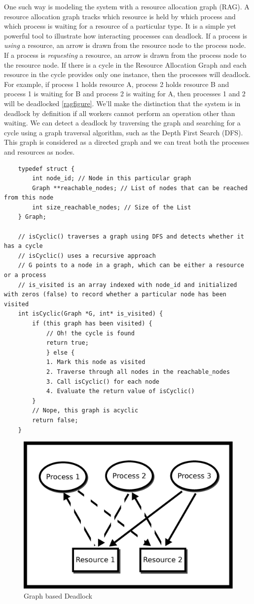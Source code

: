 One such way is modeling the system with a resource allocation graph (\gls{RAG}).
A resource allocation graph tracks which resource is held by which process and which process is waiting for a resource of a particular type.
It is a simple yet powerful tool to illustrate how interacting processes can deadlock.
If a process is \emph{using} a resource, an arrow is drawn from the resource node to the process node.
If a process is \emph{requesting} a resource, an arrow is drawn from the process node to the resource node.
If there is a cycle in the Resource Allocation Graph and each resource in the cycle provides only one instance, then the processes will deadlock.
For example, if process 1 holds resource A, process 2 holds resource B and process 1 is waiting for B and process 2 is waiting for A, then processes 1 and 2 will be deadlocked \ref{ragfigure}.
We'll make the distinction that the system is in deadlock by definition if all workers cannot perform an operation other than waiting.
We can detect a deadlock by traversing the graph and searching for a cycle using a graph traversal algorithm, such as the Depth First Search (DFS).
This graph is considered as a directed graph and we can treat both the processes and resources as nodes.

\begin{verbatim}
	typedef struct {
		int node_id; // Node in this particular graph
		Graph **reachable_nodes; // List of nodes that can be reached from this node
		int size_reachable_nodes; // Size of the List
	} Graph;
	
	// isCyclic() traverses a graph using DFS and detects whether it has a cycle
	// isCyclic() uses a recursive approach
	// G points to a node in a graph, which can be either a resource or a process
	// is_visited is an array indexed with node_id and initialized with zeros (false) to record whether a particular node has been visited
	int isCyclic(Graph *G, int* is_visited) {
		if (this graph has been visited) {
			// Oh! the cycle is found
			return true;
			} else {
			1. Mark this node as visited
			2. Traverse through all nodes in the reachable_nodes
			3. Call isCyclic() for each node
			4. Evaluate the return value of isCyclic()
		}
		// Nope, this graph is acyclic
		return false;
	}
\end{verbatim}

\begin{figure}[H]
	\centering
	\includegraphics[width=.5\textwidth]{deadlock/drawings/deadlock.eps}
	\caption{Graph based Deadlock}
\end{figure}

